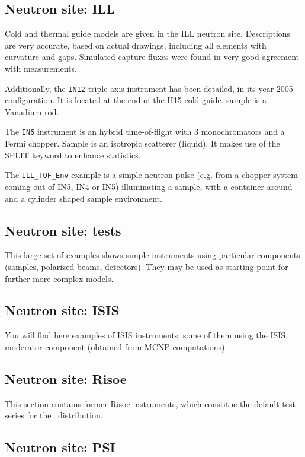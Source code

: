 \subsection{Neutron site: ILL}

Cold and thermal guide models are given in the ILL neutron site. Descriptions are very accurate, based on actual drawings, including all elements with curvature and gaps. Simulated capture fluxes were found in very good agreement with measurements.

Additionally, the \verb+IN12+ triple-axis instrument has been detailed, in its year 2005 configuration. It is located at the end of the H15 cold guide. sample is a Vanadium rod.

The \verb+IN6+ instrument is an hybrid time-of-flight with 3 monochromators and a Fermi chopper. Sample is an isotropic scatterer (liquid). It makes use of the SPLIT keyword to enhance statistics.

The \verb+ILL_TOF_Env+ example is a simple neutron pulse (e.g. from a chopper system coming out of IN5, IN4 or IN5) illuminating a sample, with a container around and a cylinder shaped sample environment.

\subsection{Neutron site: tests}

This large set of examples shows simple instruments using particular components (samples, polarized beams, detectors). They may be used as starting point for further more complex models.

\subsection{Neutron site: ISIS}

You will find here examples of ISIS instruments, some of them using the ISIS moderator component (obtained from MCNP computations).

\subsection{Neutron site: Risoe}

This section contains former Risoe instruments, which constitue the default test series for the \MCS\ distribution.

\subsection{Neutron site: PSI}


